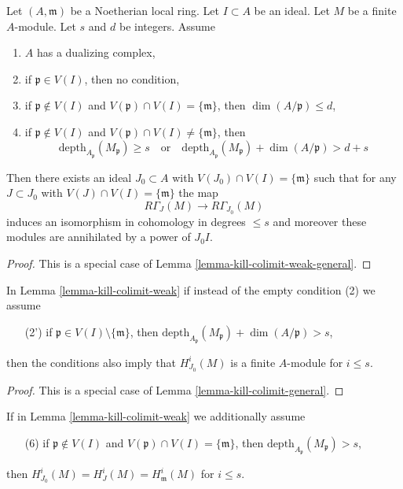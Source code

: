 \begin{lemma}
\label{lemma-kill-colimit-weak}
Let $(A, \mathfrak m)$ be a Noetherian local ring.
Let $I \subset A$ be an ideal. Let $M$ be a finite $A$-module.
Let $s$ and $d$ be integers. Assume
\begin{enumerate}
\item $A$ has a dualizing complex,
\item if $\mathfrak p \in V(I)$, then no condition,
\item if $\mathfrak p \not \in V(I)$ and
$V(\mathfrak p) \cap V(I) = \{\mathfrak m\}$, then
$\dim(A/\mathfrak p) \leq d$,
\item if $\mathfrak p \not \in V(I)$ and
$V(\mathfrak p) \cap V(I) \not = \{\mathfrak m\}$, then
$$
\text{depth}_{A_\mathfrak p}(M_\mathfrak p) \geq s
\quad\text{or}\quad
\text{depth}_{A_\mathfrak p}(M_\mathfrak p) + \dim(A/\mathfrak p) > d + s
$$
\end{enumerate}
Then there exists an ideal $J_0 \subset A$ with
$V(J_0) \cap V(I) = \{\mathfrak m\}$ such that for any $J \subset J_0$ with
$V(J) \cap V(I) = \{\mathfrak m\}$ the map
$$
R\Gamma_J(M) \longrightarrow R\Gamma_{J_0}(M)
$$
induces an isomorphism in cohomology in degrees $\leq s$
and moreover these modules are annihilated by a power of $J_0I$.
\end{lemma}

\begin{proof}
This is a special case of Lemma \ref{lemma-kill-colimit-weak-general}.
\end{proof}

\begin{lemma}
\label{lemma-kill-colimit}
In Lemma \ref{lemma-kill-colimit-weak} if instead of the empty
condition (2) we assume
\begin{enumerate}
\item[(2')] if $\mathfrak p \in V(I) \setminus \{\mathfrak m\}$, then
$\text{depth}_{A_\mathfrak p}(M_\mathfrak p) + \dim(A/\mathfrak p) > s$,
\end{enumerate}
then the conditions also imply that $H^i_{J_0}(M)$ is a finite
$A$-module for $i \leq s$.
\end{lemma}

\begin{proof}
This is a special case of Lemma \ref{lemma-kill-colimit-general}.
\end{proof}

\begin{lemma}
\label{lemma-kill-colimit-support}
If in Lemma \ref{lemma-kill-colimit-weak} we additionally assume
\begin{enumerate}
\item[(6)] if $\mathfrak p \not \in V(I)$ and
$V(\mathfrak p) \cap V(I) = \{\mathfrak m\}$, then
$\text{depth}_{A_\mathfrak p}(M_\mathfrak p) > s$,
\end{enumerate}
then $H^i_{J_0}(M) = H^i_J(M) = H^i_\mathfrak m(M)$ for $i \leq s$.
\end{lemma}

